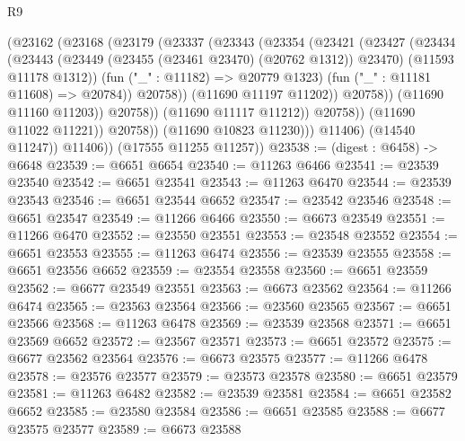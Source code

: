 \begin{lexlean}{R9}
\begin{coremodule}
                              (@23162
                                (@23168
                                  (@23179
                                    (@23337
                                      (@23343
                                        (@23354
                                          (@23421
                                            (@23427
                                              (@23434
                                                (@23443
                                                  (@23449
                                                    (@23455 (@23461 @23470) (@20762 @1312))
                                                    @23470)
                                                  (@11593 @11178 @1312))
                                                (fun ("_" : @11182) => @20779 @1323)
                                                (fun ("_" : @11181 @11608) => @20784))
                                              @20758))
                                          (@11690 @11197 @11202))
                                        @20758))
                                    (@11690 @11160 @11203))
                                  @20758))
                              (@11690 @11117 @11212))
                            @20758))
                        (@11690 @11022 @11221))
                      @20758))
                  (@11690 @10823 @11230)))
              @11406)
            (@14540 @11247))
          @11406))
      (@17555 @11255 @11257))
@23538 := (digest : @6458) -> @6648
@23539 := @6651 @6654
@23540 := @11263 @6466
@23541 := @23539 @23540
@23542 := @6651 @23541
@23543 := @11263 @6470
@23544 := @23539 @23543
@23546 := @6651 @23544 @6652
@23547 := @23542 @23546
@23548 := @6651 @23547
@23549 := @11266 @6466
@23550 := @6673 @23549
@23551 := @11266 @6470
@23552 := @23550 @23551
@23553 := @23548 @23552
@23554 := @6651 @23553
@23555 := @11263 @6474
@23556 := @23539 @23555
@23558 := @6651 @23556 @6652
@23559 := @23554 @23558
@23560 := @6651 @23559
@23562 := @6677 @23549 @23551
@23563 := @6673 @23562
@23564 := @11266 @6474
@23565 := @23563 @23564
@23566 := @23560 @23565
@23567 := @6651 @23566
@23568 := @11263 @6478
@23569 := @23539 @23568
@23571 := @6651 @23569 @6652
@23572 := @23567 @23571
@23573 := @6651 @23572
@23575 := @6677 @23562 @23564
@23576 := @6673 @23575
@23577 := @11266 @6478
@23578 := @23576 @23577
@23579 := @23573 @23578
@23580 := @6651 @23579
@23581 := @11263 @6482
@23582 := @23539 @23581
@23584 := @6651 @23582 @6652
@23585 := @23580 @23584
@23586 := @6651 @23585
@23588 := @6677 @23575 @23577
@23589 := @6673 @23588

\end{coremodule}
\end{lexlean}
